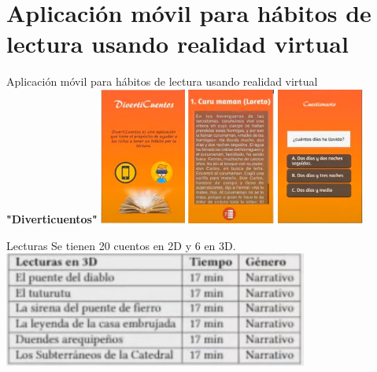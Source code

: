 \documentclass[11pt]{beamer}
\begin{document}
\section{Aplicación móvil para hábitos de lectura usando realidad virtual}
\begin{frame}{Aplicación móvil para hábitos de lectura usando realidad virtual}
\center\textbf{"Diverticuentos"}
\center\includegraphics[height=4.5cm]{img/Inicio app movil.jpeg}
\includegraphics[height=4.5cm]{img/Cuento.jpeg}
\includegraphics[height=4.5cm]{img/Cuestionario.jpeg}
\end{frame}

\begin{frame}{Lecturas}
\center Se tienen 20 cuentos en 2D y 6 en 3D.
\center\includegraphics[width=10cm]{img/Cuadro2.jpeg}
\end{frame}
\end{document}
